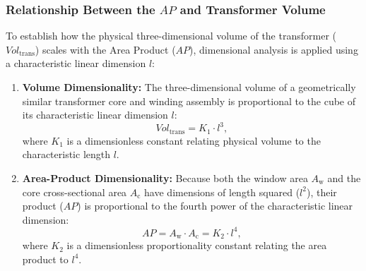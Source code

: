 \subsubsection*{Relationship Between the $AP$ and Transformer Volume}
To establish how the physical three-dimensional volume of the transformer ($Vol_{\mathrm{trans}}$) scales with the Area Product ($AP$), dimensional analysis is applied using a characteristic linear dimension $l$:
\begin{enumerate}
    \item \textbf{Volume Dimensionality:} The three-dimensional volume of a geometrically similar transformer core and winding assembly is proportional to the cube of its characteristic linear dimension $l$:
    \begin{equation}
        Vol_{\mathrm{trans}} = K_1 \cdot l^3, \label{eq:app_vol_l3}
    \end{equation}
    where $K_1$ is a dimensionless constant relating physical volume to the characteristic length $l$.
    
    \item \textbf{Area-Product Dimensionality:} Because both the window area $A_{\mathrm{w}}$ and the core cross-sectional area $A_{\mathrm{c}}$ have dimensions of length squared ($l^2$), their product ($AP$) is proportional to the fourth power of the characteristic linear dimension:
    \begin{equation}
        AP = A_{\mathrm{w}} \cdot A_{\mathrm{c}} = K_2 \cdot l^4, \label{eq:app_ap_l4}
    \end{equation}
    where $K_2$ is a dimensionless proportionality constant relating the area product to $l^4$.
\end{enumerate}

